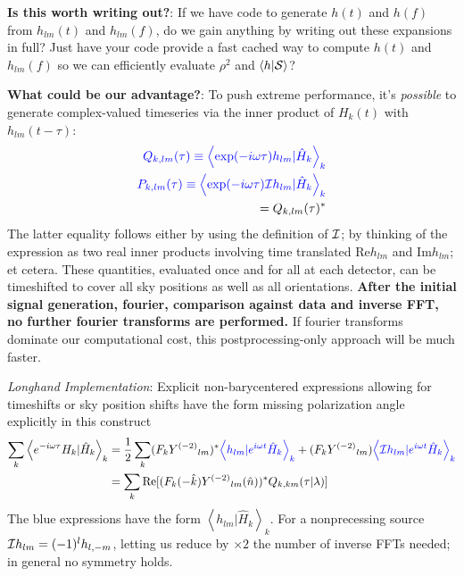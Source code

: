 \documentclass[twocolumn,prd,nofootinbib]{revtex4}
\newcommand\editremark[1]{{\color{red} #1}}
\newcommand\Y[1]{Y^{(#1)}{}}
\newcommand\qmstateproduct[2]{\left\langle#1|#2\right\rangle}
\begin{document}
\noindent \textbf{Is this worth writing out?}: If we have code to generate $h(t)$ and $h(f)$ from $h_{lm}(t)$ and
$h_{lm}(f)$, do we gain anything by writing out these expansions in full?  Just have your code provide a fast cached way
to compute $h(t)$ and $h_{lm}(f)$ so we can efficiently evaluate $\rho^2$ and $\qmstateproduct{h}{{\cal S}}$?

\noindent \textbf{What could be our advantage?}: To push extreme performance, it's \emph{possible} to generate complex-valued
timeseries via the inner product of $H_k(t)$ with $h_{lm}(t-\tau)$:
\begin{eqnarray}
{\color{blue}Q_{k,lm}(\tau) \equiv \qmstateproduct{\exp(-i\omega \tau) h_{lm}}{\hat{H}_k}_k} \\
{\color{blue}P_{k,lm}(\tau) \equiv \qmstateproduct{\exp(-i\omega \tau){\cal I}h_{lm}}{\hat{H}_k}_k}\nonumber \\
 = Q_{k,lm}(\tau)^*
\end{eqnarray}
The latter equality follows either by using the definition of ${\cal I}$; by thinking of the expression as two real
inner products involving time translated $\text{Re}h_{lm}$ and $\text{Im}h_{lm}$; et cetera. 
These quantities, evaluated once and for all at each detector, can be  timeshifted to cover all sky positions as well as all orientations.  \textbf{After the
initial signal generation, fourier, comparison against data and inverse FFT, no further fourier transforms are performed. }
%
If fourier transforms dominate our computational cost, this postprocessing-only approach will be much faster.

\begin{widetext}
\noindent \emph{Longhand Implementation}: Explicit non-barycentered expressions allowing for timeshifts or sky position
shifts have the form \editremark{missing polarization angle explicitly in this construct}
\begin{align}
\label{eq:IndividualDetectorLikelihoodTimeseries:ViaSpinWeightBasis}
\sum_k\qmstateproduct{e^{-i \omega \tau} H_k}{\hat{H}_k}_k
&= \frac{1}{2} \sum_k (F_k \Y{-2}_{lm})^* {\color{blue} \qmstateproduct{ h_{lm}}{e^{i\omega t}\hat{H}_k}_k}
   + (F_k \Y{-2}_{lm}) {\color{blue}\qmstateproduct{{\cal I} h_{lm}}{e^{i\omega t}\hat{H}_k}_k} \\
 &= \sum_k \text{Re}[(F_k(-\hat{k}) \Y{-2}_{lm}(\hat{n}))^* Q_{k,km}(\tau|\lambda)]
\end{align}
The blue expressions have the form $\qmstateproduct{h_{lm}}{\hat{H}_k}_k$.  For a nonprecessing source ${\cal I} h_{lm}
=(-1)^l h_{l,-m}$, letting us reduce by $\times 2$ the number of inverse FFTs needed; in general no symmetry holds. 

\end{widetext}
\end{document}

